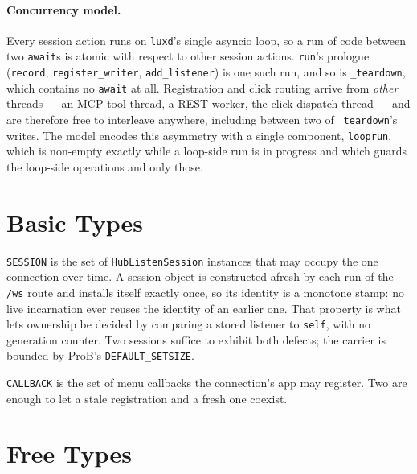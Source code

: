 \documentclass[a4paper,10pt,fleqn]{article}
\begin{document}
\paragraph{Concurrency model.}
Every session action runs on \texttt{luxd}'s single asyncio loop, so a
run of code between two \texttt{await}s is atomic with respect to other
session actions.  \texttt{run}'s prologue (\texttt{record},
\texttt{register\_writer}, \texttt{add\_listener}) is one such run, and
so is \texttt{\_teardown}, which contains no \texttt{await} at all.
Registration and click routing arrive from \emph{other} threads --- an
MCP tool thread, a REST worker, the click-dispatch thread --- and are
therefore free to interleave anywhere, including between two of
\texttt{\_teardown}'s writes.  The model encodes this asymmetry with a
single component, \texttt{looprun}, which is non-empty exactly while a
loop-side run is in progress and which guards the loop-side operations
and only those.

\section{Basic Types}

\begin{zed}
\end{zed}

\texttt{SESSION} is the set of \texttt{HubListenSession} instances that
may occupy the one connection over time.  A session object is
constructed afresh by each run of the \texttt{/ws} route and installs
itself exactly once, so its identity is a monotone stamp: no live
incarnation ever reuses the identity of an earlier one.  That property
is what lets ownership be decided by comparing a stored listener to
\texttt{self}, with no generation counter.  Two sessions suffice to
exhibit both defects; the carrier is bounded by ProB's
\texttt{DEFAULT\_SETSIZE}.

\texttt{CALLBACK} is the set of menu callbacks the connection's app may
register.  Two are enough to let a stale registration and a fresh one
coexist.

\section{Free Types}
\end{document}
